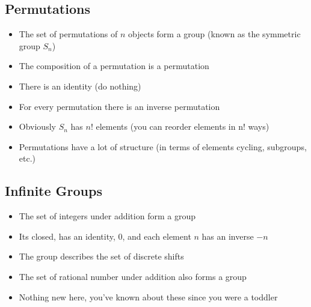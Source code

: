
\begin{slide}
  \section{Permutations}

\begin{PauseHighLight}
  \begin{itemize}
  \item The set of permutations of $n$ objects form a group (known as
    the symmetric group $S_n$)\pause
  \item The composition of a permutation is a permutation\pause
  \item There is an identity (do nothing)\pause
  \item For every permutation there is an inverse permutation\pause
  \item Obviously $S_n$ has $n!$ elements\pause{} (you can reorder elements in
    n! ways)\pauseb
  \item Permutations have a lot of structure (in terms of elements
    cycling, subgroups, etc.)\pause
  \end{itemize}
\end{PauseHighLight}


\end{slide}


\begin{slide}
\section{Infinite Groups}

\begin{PauseHighLight}
  \begin{itemize}
  \item The set of integers under addition form a group\pause
  \item Its closed, has an identity, 0, and each element $n$ has an
    inverse $-n$\pause
  \item The group describes the set of discrete shifts\pause
  \item The set of rational number under addition also forms a
    group\pause
  \item Nothing new here, you've known about these since you were a toddler\pauseb
  \end{itemize}
\end{PauseHighLight}

\end{slide}

